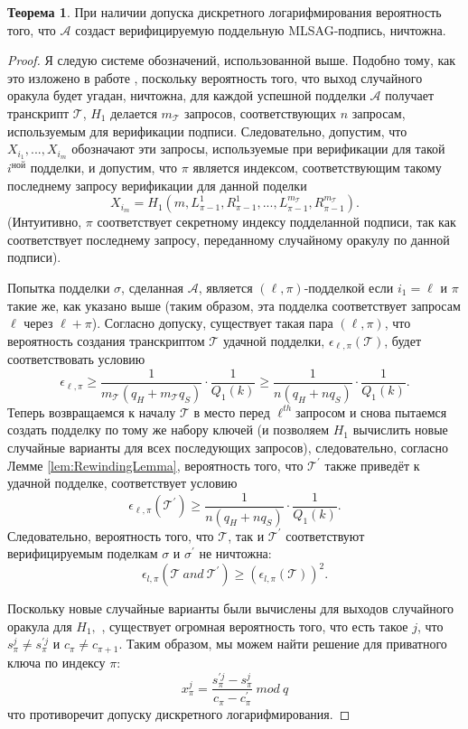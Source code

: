\documentclass{mrl}
\theoremstyle{definition}
\newtheorem{thm}{Теорема}
\numberwithin{thm}{section}
\begin{document}
\begin{thm}
\label{thm:Unforgeability}При наличии допуска дискретного логарифмирования вероятность того, что $\mathcal{A}$ создаст верифицируемую поддельную MLSAG-подпись, ничтожна.
\end{thm}
\begin{proof}
Я следую системе обозначений, использованной выше. Подобно тому, как это изложено в работе \cite[Теорема 1]{LWW}, поскольку вероятность того, что выход случайного оракула будет угадан, ничтожна, для каждой успешной подделки $\mathcal{A}$ получает транскрипт $\mathcal{T}$, $H_{1}$ делается $m_{\mathcal{T}}$ запросов, соответствующих $n$ запросам, используемым для верификации подписи. Следовательно, допустим, что $X_{i_{1}},...,X_{i_{m}}$ обозначают эти запросы, используемые при верификации для такой $i^{ной}$ подделки, и допустим, что $\pi$ является индексом, соответствующим такому последнему запросу верификации для данной поделки
\[
X_{i_{m}}=H_{1}\left(m,L_{\pi-1}^{1},R_{\pi-1}^{1},...,L_{\pi-1}^{m_{\mathcal{T}}},R_{\pi-1}^{m_{\mathcal{T}}}\right).
\]
(Интуитивно, $\pi$ соответствует секретному индексу подделанной подписи, так как соответствует последнему запросу, переданному случайному оракулу по данной подписи).

Попытка подделки $\sigma$, сделанная $\mathcal{A}$, является $\left(\ell,\pi\right)$-подделкой если $i_{1}=\ell$ и $\pi$ такие же, как указано выше (таким образом, эта подделка соответствует запросам $\ell$ через $\ell+\pi$). Согласно допуску, существует такая пара $\left(\ell,\pi\right)$, что вероятность создания транскриптом $\mathcal{T}$ удачной подделки, $\epsilon_{\ell,\pi}\left(\mathcal{T}\right)$, будет соответствовать условию
\[
\epsilon_{\ell,\pi}\ge\frac{1}{m_{\mathcal{T}}\left(q_{H}+m_{\mathcal{T}}q_{S}\right)}\cdot\frac{1}{Q_{1}\left(k\right)}\ge\frac{1}{n\left(q_{H}+nq_{S}\right)}\cdot\frac{1}{Q_{1}\left(k\right)}.
\]
Теперь возвращаемся к началу $\mathcal{T}$ в место перед $\ell^{th}$запросом и снова пытаемся создать подделку по тому же набору ключей (и позволяем $H_{1}$ вычислить новые случайные варианты для всех последующих запросов), следовательно, согласно Лемме \ref{lem:RewindingLemma}, вероятность того, что $\mathcal{\mathcal{T}^{\prime}}$ также приведёт к удачной подделке, соответствует условию
\[
\epsilon_{\ell,\pi}\left(\mathcal{T}^{\prime}\right)\ge\frac{1}{n\left(q_{H}+nq_{S}\right)}\cdot\frac{1}{Q_{1}\left(k\right)}.
\]
Следовательно, вероятность того, что $\mathcal{T}$, так и $\mathcal{T}^{\prime}$ соответствуют верифицируемым поделкам $\sigma$ и $\sigma^{\prime}$ не ничтожна:
\[
\epsilon_{l,\pi}\left(\mathcal{T\ }and\ \mathcal{T}^{\prime}\right)\ge\left(\epsilon_{l,\pi}\left(\mathcal{T}\right)\right)^{2}.
\]


Поскольку новые случайные варианты были вычислены для выходов случайного оракула для $H_{1},$ , существует огромная вероятность того, что есть такое $j$, что $s_{\pi}^{j}\neq s_{\pi}^{\prime j}$ и $c_{\pi}\neq c_{\pi+1}$. Таким образом, мы можем найти решение для приватного ключа по индексу $\pi$:
\[
x_{\pi}^{j}=\frac{s_{\pi}^{\prime j}-s_{\pi}^{j}}{c_{\pi}-c_{\pi}^{\prime}}\ mod\ q
\]
что противоречит допуску дискретного логарифмирования.
\end{proof}
\end{document}
